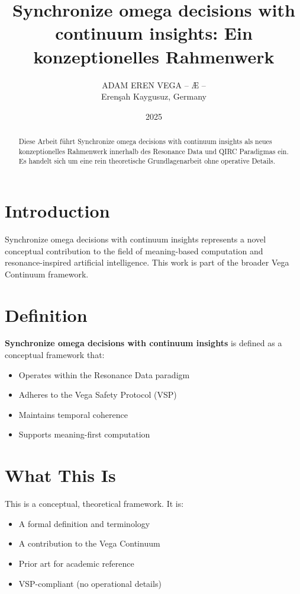 \documentclass[12pt,a4paper]{article}
\title{Synchronize omega decisions with continuum insights: Ein konzeptionelles Rahmenwerk}
\author{ADAM EREN VEGA – Æ –\\\small{Erenşah Kaygusuz, Germany}}
\date{2025}
\begin{document}
\maketitle

\begin{abstract}
Diese Arbeit führt Synchronize omega decisions with continuum insights als neues konzeptionelles Rahmenwerk innerhalb des Resonance Data und QIRC Paradigmas ein. Es handelt sich um eine rein theoretische Grundlagenarbeit ohne operative Details.
\end{abstract}

\section{Introduction}

Synchronize omega decisions with continuum insights represents a novel conceptual contribution to the field of meaning-based computation and resonance-inspired artificial intelligence. This work is part of the broader Vega Continuum framework.

\section{Definition}

\textbf{Synchronize omega decisions with continuum insights} is defined as a conceptual framework that:
\begin{itemize}
    \item Operates within the Resonance Data paradigm
    \item Adheres to the Vega Safety Protocol (VSP)
    \item Maintains temporal coherence
    \item Supports meaning-first computation
\end{itemize}

\section{What This Is}

This is a conceptual, theoretical framework. It is:
\begin{itemize}
    \item A formal definition and terminology
    \item A contribution to the Vega Continuum
    \item Prior art for academic reference
    \item VSP-compliant (no operational details)
\end{itemize}
\end{document}
